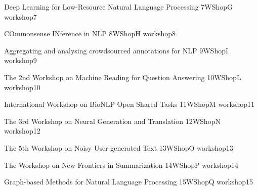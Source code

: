 \begin{wsschedule}
 {Deep Learning for Low-Resource Natural Language Processing}
 {7}{WShopG}
 {workshop7}
 {\WShopLocG}
 
\end{wsschedule}

\begin{wsschedule}
 {COmmonsense INference in NLP}
 {8}{WShopH}
 {workshop8}
 {\WShopLocH}
 
\end{wsschedule}

\begin{wsschedule}
 {Aggregating and analysing crowdsourced annotations for NLP}
 {9}{WShopI}
 {workshop9}
 {\WShopLocI}
 
\end{wsschedule}



\begin{wsschedule}
 {The 2nd Workshop on Machine Reading for Question Answering}
 {10}{WShopL}
 {workshop10}
 {\WShopLocL}
 
\end{wsschedule}
 
\begin{wsschedule}
 {International Workshop on BioNLP Open Shared Tasks}
 {11}{WShopM}
 {workshop11}
 {\WShopLocM}
 
\end{wsschedule}

\begin{wsschedule}
 {The 3rd Workshop on Neural Generation and Translation}
 {12}{WShopN}
 {workshop12}
 {\WShopLocN}
 
\end{wsschedule}

\begin{wsschedule}
 {The 5th Workshop on Noisy User-generated Text}
 {13}{WShopO}
 {workshop13}
 {\WShopLocO}
 
\end{wsschedule}

\begin{wsschedule}
 {The Workshop on New Frontiers in Summarization}
 {14}{WShopP}
 {workshop14}
 {\WShopLocP}
 
\end{wsschedule}

\begin{wsschedule}
 {Graph-based Methods for Natural Language Processing}
 {15}{WShopQ}
 {workshop15}
 {\WShopLocQ}
 
\end{wsschedule}

